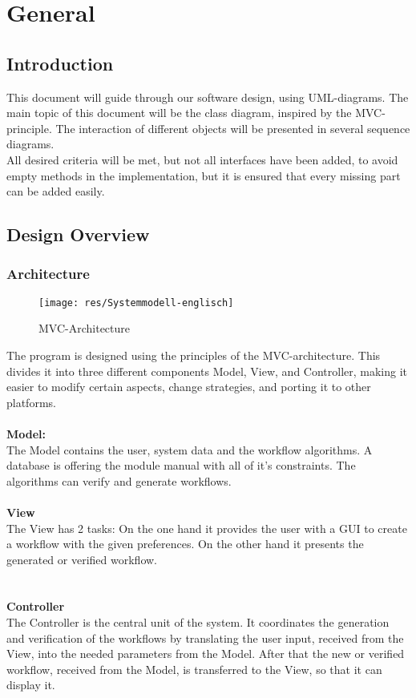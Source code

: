\documentclass[11pt,a4paper]{report}
\begin{document}
\part{General}{
	
	\chapter{Introduction}{
		This document will guide through our software design, using UML-diagrams. The main topic of this document will be the class diagram, inspired by the MVC-principle. The interaction of different objects will be presented in several sequence diagrams. \\
		All desired criteria will be met, but not all interfaces have been added, to avoid empty methods in the implementation, but it is ensured that every missing part can be added easily.
	}
	
	\chapter{Design Overview}{
		
		\section{Architecture}{
			\begin{figure}[ht]
				\centering
				\texttt{[image: res/Systemmodell-englisch]}
				\caption{MVC-Architecture}
			\end{figure}
			
			The program is designed using the principles of the MVC-architecture. This divides it into three different components Model, View, and Controller, making it easier to modify certain aspects, change strategies, and porting it to other platforms. 
			\\ \\
			{\bf Model:}
			\\
			The Model contains the user, system data and the workflow algorithms. A database is offering the module manual with all of it's constraints. The algorithms can verify and generate workflows.
			\\ \\
			{\bf View}
			\\
			The View has 2 tasks: On the one hand it provides the user with a GUI to create a workflow with the given preferences. On the other hand it presents the generated or verified workflow.\\
			\\ \\
			{\bf Controller}
			\\
			The Controller is the central unit of the system. It coordinates the generation and verification of the workflows by translating the user input, received from the View, into the needed parameters from the Model. After that the new or verified workflow, received from the Model, is transferred to the View, so that it can display it.
		}
		
}}
\end{document}
